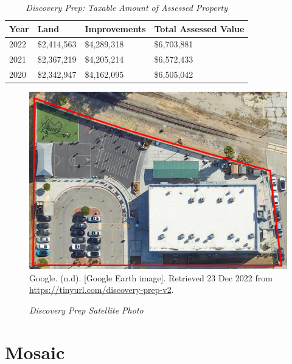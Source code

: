 \begin{table}[hbt]
  \SingleSpacing%
  \caption[Discovery Prep: Taxable Amount of Assessed Propery]{\textit{Discovery Prep: Taxable Amount of Assessed Property}}\label{tab:discovery-prep-taxable-amount}
  \begin{tabular}{llll}
    \toprule
    Year & Land        & Improvements & Total Assessed Value \\
    \midrule
    2022 & \$2,414,563 & \$4,289,318  & \$6,703,881 \\
    2021 & \$2,367,219 & \$4,205,214  & \$6,572,433 \\
    2020 & \$2,342,947 & \$4,162,095  & \$6,505,042 \\
    \bottomrule
  \end{tabular}
\end{table}

\begin{figure}[hbt]
  \caption[Discovery Prep Satellite Photo]{\textit{Discovery Prep Satellite Photo}}\label{fig:discovery-prep-sat-photo}
  \includegraphics[width=\textwidth]{Satellite-Photos/discovery-prep-sat-photo}\\ %
  \footnotesize{Google. (n.d). [Google Earth image]. Retrieved 23 Dec 2022 from \url{https://tinyurl.com/discovery-prep-v2}.}
\end{figure}


\clearpage
\section{Mosaic}\label{sec:mosaic-info}\indent


